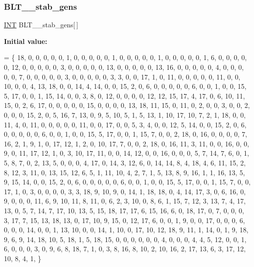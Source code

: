 \subsubsection{\texorpdfstring{B\+L\+T\+\_\+\_\+stab\+\_\+gens}{BLT\_19\_stab\_gens}}
{\footnotesize\ttfamily \mbox{\hyperlink{galois_8h_a09fddde158a3a20bd2dcadb609de11dc}{I\+NT}} B\+L\+T\+\_\+\_\+stab\+\_\+gens\mbox{[}$\,$\mbox{]}}

{\bfseries Initial value\+:}
\begin{DoxyCode}
= \{
18,  0,  0,  0,  0,  0,  1,  0,  0,  0,  0,  0,  1,  0,  0,  0,  0,  0,  1,  0,  0,  0,  0,  0,  1, 
 6,  0,  0,  0,  0,  0, 12,  0,  0,  0,  0,  0,  3,  0,  0,  0,  0,  0, 13,  0,  0,  0,  0,  0, 13, 
16,  0,  0,  0,  0,  0,  4,  0,  0,  0,  0,  0,  7,  0,  0,  0,  0,  0,  3,  0,  0,  0,  0,  0,  3, 
 3,  0,  0, 17,  1,  0, 11,  0,  0,  0,  0,  0, 11,  0,  0, 10,  0,  0,  4, 13, 18,  0,  0, 14,  4, 
14,  0,  0, 15,  2,  0,  6,  0,  0,  0,  0,  0,  6,  0,  0,  1,  0,  0, 15,  5, 17,  0,  0,  1, 15, 
14,  0,  0,  3,  8,  0, 12,  0,  0,  0,  0, 12, 12, 15, 17,  4, 17,  0,  6, 10, 11, 15,  0,  2,  6, 
17,  0,  0,  0,  0,  0, 15,  0,  0,  0,  0, 13, 18, 11, 15,  0, 11,  0,  2,  0,  0,  3,  0,  0,  2, 
 0,  0,  0, 15,  2,  0,  5, 16,  7, 13,  0,  9,  5, 10,  5,  1,  5, 13,  1, 10, 17, 10,  7,  2,  1, 
18,  0,  0, 11,  4,  0, 11,  0,  0,  0,  0,  0, 11,  0,  0, 17,  0,  0,  5,  3,  4,  0,  0, 12,  5, 
14,  0,  0, 15,  2,  0,  6,  0,  0,  0,  0,  0,  6,  0,  0,  1,  0,  0, 15,  5, 17,  0,  0,  1, 15, 
 7,  0,  0,  2, 18,  0, 16,  0,  0,  0,  0,  7, 16,  2,  1,  9,  1,  0, 17, 12,  1,  2,  0, 10, 17, 
 7,  0,  0,  2, 18,  0, 16, 11,  3, 11,  0,  0, 16,  0,  0,  9,  0, 11, 17, 12,  1,  0,  3, 10, 17, 
11,  0,  0, 14, 12,  0,  0, 16,  0,  0,  0,  5,  7, 14,  7,  6,  0,  1,  5,  8,  7,  0,  2, 13,  5, 
 0,  0,  0,  4, 17,  0, 14,  3, 12,  6,  0, 14, 14,  8,  4, 18,  4,  6, 11, 15,  2,  8, 12,  3, 11, 
 0, 13, 15, 12,  6,  5,  1, 11, 10,  4,  2,  7,  1,  5, 13,  8,  9, 16,  1,  1, 16, 13,  5,  9, 15, 
14,  0,  0, 15,  2,  0,  6,  0,  0,  0,  0,  0,  6,  0,  0,  1,  0,  0, 15,  5, 17,  0,  0,  1, 15, 
 7,  0,  0, 17,  1,  0,  3,  0,  0,  0,  0,  3,  3, 18,  9, 10,  9,  0, 14,  1, 18, 18,  0,  4, 14, 
17,  3,  0,  6, 16,  0,  9,  0,  0,  0, 11,  6,  9, 10, 11,  8, 11,  0,  6,  2,  3, 10,  0,  8,  6, 
 1, 15,  7, 12,  3, 13,  7,  4, 17, 13,  0,  5,  7, 14,  7, 17, 10, 13,  5, 15, 18, 17, 17,  6, 15, 
16,  6,  0, 18, 17,  0,  7,  0,  0,  0,  3, 17,  7, 15, 13, 18, 13,  0, 17, 10,  9, 15,  0, 12, 17, 
 6,  0,  0,  1,  9,  0,  0, 17,  0,  0,  0,  6,  0,  0,  0, 14,  0,  0,  1, 13, 10,  0,  0, 14,  1, 
10,  0, 17, 10, 12, 18,  9, 11,  1, 14,  0,  1,  9, 18,  9,  6,  9, 14, 18, 10,  5, 18,  1,  5, 18, 
15,  0,  0,  0,  0,  0,  0,  4,  0,  0,  0,  4,  4,  5, 12,  0,  0,  1,  6,  0,  0,  0,  3,  0,  9, 
 6,  8, 18,  7,  1,  0,  3,  8, 16,  8, 10,  2, 10, 16,  2, 17, 13,  6,  3, 17, 12, 10,  8,  4,  1, 
\}
\end{DoxyCode}

